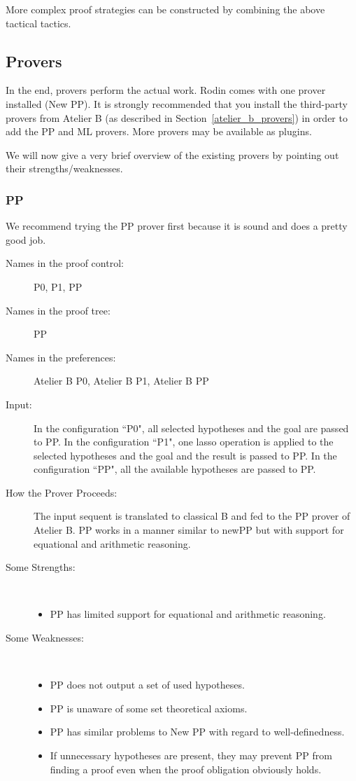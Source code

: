 More complex proof strategies can be constructed by combining the above tactical tactics. 

\subsection{Provers}
\label{atelier_b_provers}

In the end, provers perform the actual work.  Rodin comes with one prover installed (New PP).  It is strongly recommended that you install the third-party provers from Atelier B (as described in Section~\ref{atelier_b_provers}) in order to add the PP and ML provers.  More provers may be available as plugins.

We will now give a very brief overview of the existing provers by pointing out their strengths/weaknesses.

\subsubsection{PP}

We recommend trying the PP prover first because it is sound and does a pretty good job.

\begin{description}
	\item[Names in the proof control:]  P0, P1, PP
	\item[Names in the proof tree:] PP
	\item[Names in the preferences:] Atelier B P0, Atelier B P1, Atelier B PP
	\item[Input:] In the configuration ``P0", all selected hypotheses and the goal are passed to PP. In the configuration ``P1", one lasso operation is applied to the selected hypotheses and the goal and the result is passed to PP. In the configuration ``PP", all the available hypotheses are passed to PP.
	\item[How the Prover Proceeds:] The input sequent is translated to classical B and fed to the PP prover of Atelier B. PP works in a manner similar to newPP but with support for equational and arithmetic reasoning.
	\item[Some Strengths:] ~
	\begin{itemize}
		\item PP has limited support for equational and arithmetic reasoning. 
	\end{itemize}
	\item[Some Weaknesses:] ~
\begin{itemize}
	\item PP does not output a set of used hypotheses.
	\item PP is unaware of some set theoretical axioms.
	\item PP has similar problems to New PP with regard to well-definedness.
	\item If unnecessary hypotheses are present, they may prevent PP from finding a proof even when the proof obligation obviously holds. 
\end{itemize}
\end{description}

